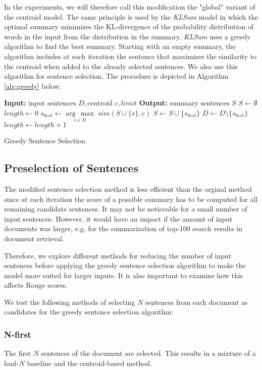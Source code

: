 \documentclass[11pt,letterpaper]{article}
\newcommand{\argmax}[1]{\underset{#1}{\operatorname{arg}\,\operatorname{max}}\;}
\begin{document}
In the experiments, we will therefore call this modification the "global" variant of the centroid model. The same principle is used by the \textit{KLSum} model \cite{haghighi2009exploring} in which the optimal summary minimizes the KL-divergence of the probability distribution of words in the input from the distribution in the summary. \textit{KLSum} uses a greedy algorithm to find the best summary. Starting with an empty summary, the algorithm includes at each iteration the sentence that maximizes the similarity to the centroid when added to the already selected sentences. We also use this algorithm for sentence selection. The procedure is depicted in Algorithm \ref{alg:greedy} below.
\begin{algorithm}[H]
	\begin{algorithmic}[1]
		\State \textbf{Input:} $\text{input sentences } D, \text{centroid } c, limit$
		\State \textbf{Output:} $\text{summary sentences } S$
		\State $S \leftarrow \emptyset$
		\State $length \leftarrow 0$
		\State $s_{best} \leftarrow \argmax{s \in D} sim(S \cup \{s\}, c)$ 
		\State $S \leftarrow S \cup \{s_{best}\}$
		\State $D \leftarrow D \setminus \{s_{best}\}$
		\State $length \leftarrow length + 1$
		\EndWhile\label{greedy}
	\end{algorithmic}
	\caption{Greedy Sentence Selection}
	\label{alg:greedy}
\end{algorithm}
\subsection{Preselection of Sentences}
The modified sentence selection method is less efficient than the orginal method since at each iteration the score of a possible summary has to be computed for all remaining candidate sentences. It may not be noticeable for a small number of input sentences. However, it would have an impact if the amount of input documents was larger, e.g. for the summarization of top-100 search results in document retrieval.

Therefore, we explore different methods for reducing the number of input sentences before applying the greedy sentence selection algorithm to make the model more suited for larger inputs. It is also important to examine how this affects Rouge scores.

 We test the following methods of selecting $N$ sentences from each document as candidates for the greedy sentence selection algorithm:
\subsubsection*{N-first}
The first $N$ sentences of the document are selected. This results in a mixture of a lead-$N$ baseline and the centroid-based method.
\end{document}
